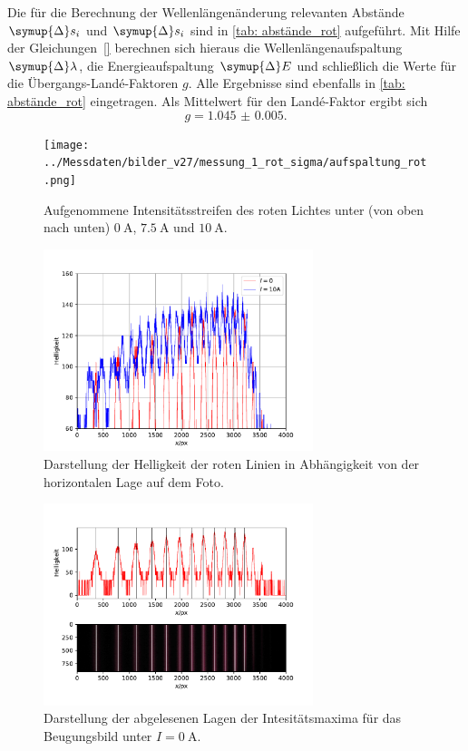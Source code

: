Die für die Berechnung der Wellenlängenänderung relevanten Abstände $\symup{\Delta} s_i$ und $\symup{\Delta} s_i$ sind in \autoref{tab: abstände_rot}
aufgeführt. Mit Hilfe der Gleichungen~\eqref{} berechnen sich hieraus die Wellenlängenaufspaltung $\symup{\Delta} \lambda$, die
Energieaufspaltung $\symup{\Delta} E$ und schließlich die Werte für die Übergangs-Landé-Faktoren $g$. Alle Ergebnisse sind ebenfalls in
\autoref{tab: abstände_rot} eingetragen. Als Mittelwert für den Landé-Faktor ergibt sich
\begin{equation}
  g = \num{1.045(5)}.
\end{equation}
\begin{figure}
  \centering
  \texttt{[image: ../Messdaten/bilder\_v27/messung\_1\_rot\_sigma/aufspaltung\_rot.png]}
  \caption{Aufgenommene Intensitätsstreifen des roten Lichtes unter (von oben nach unten) $\SI{0}{\ampere}$, $\SI{7.5}{\ampere}$ und $\SI{10}{\ampere}$.}
  \label{fig: aufspaltung_rot}
\end{figure}
\begin{figure}
  \centering
  \includegraphics[width = 0.7\textwidth]{../Messdaten/plots/rot_sigma_intensitaet.pdf}
  \caption{Darstellung der Helligkeit der roten Linien in Abhängigkeit von der horizontalen Lage auf dem Foto.}
  \label{fig: rot_intensität}
\end{figure}

\begin{figure}
  \centering
  \includegraphics[width = 0.7\textwidth]{../Messdaten/plots/peaks_rot_sigma_0.pdf}
  \caption{Darstellung der abgelesenen Lagen der Intesitätsmaxima für das Beugungsbild unter $I =\SI{0}{\ampere}$.}
  \label{fig: peaks_rot_0}
\end{figure}

